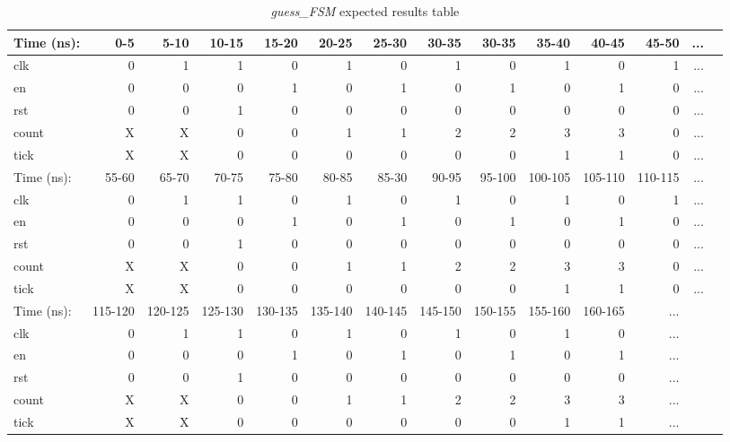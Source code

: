 \documentclass[11pt]{article}
\begin{document}
\begin{table}[ht]\centering
	\caption{\textit{guess\_FSM} expected results table}
	\label{ALU:tbl:alu_ERT}\medskip
	\begin{tabular}{l|rrrrrrrrrrrrr}
		Time (ns): & 0-5 & 5-10 & 10-15 & 15-20 & 20-25 & 25-30 & 30-35 & 30-35 & 35-40 & 40-45 & 45-50 &...\\
		\midrule
		clk & 0  & 1 & 1 & 0 & 1 & 0 & 1 & 0 & 1 & 0 & 1 & ... \\
		en & 0 & 0 & 0 & 1 & 0 & 1 & 0 & 1 & 0 & 1 & 0 & ...\\
		rst & 0 & 0 & 1& 0 & 0 & 0 & 0 & 0 & 0 & 0 & 0 & ... \\
		\midrule
		count & X & X & 0 & 0  & 1 & 1 & 2 & 2 & 3 & 3 & 0 & ... \\
		tick & X & X & 0 & 0 & 0 & 0 & 0 & 0 & 1 & 1 & 0& ... \\
		\midrule
		Time (ns): & 55-60 & 65-70 & 70-75 & 75-80 & 80-85 & 85-30 & 90-95 & 95-100 & 100-105 & 105-110 & 110-115 &...\\
		\midrule
		clk & 0  & 1 & 1 & 0 & 1 & 0 & 1 & 0 & 1 & 0 & 1 & ... \\
		en & 0 & 0 & 0 & 1 & 0 & 1 & 0 & 1 & 0 & 1 & 0 & ...\\
		rst & 0 & 0 & 1& 0 & 0 & 0 & 0 & 0 & 0 & 0 & 0 & ... \\
		\midrule
		count & X & X & 0 & 0  & 1 & 1 & 2 & 2 & 3 & 3 & 0 & ... \\
		tick & X & X & 0 & 0 & 0 & 0 & 0 & 0 & 1 & 1 & 0& ... \\
		\midrule
		Time (ns): & 115-120 & 120-125 & 125-130 & 130-135 & 135-140 & 140-145 & 145-150 & 150-155 & 155-160 & 160-165  &...\\
		\midrule
		clk & 0  & 1 & 1 & 0 & 1 & 0 & 1 & 0 & 1 & 0 & ... \\
		en & 0 & 0 & 0 & 1 & 0 & 1 & 0 & 1 & 0 & 1 & ...\\
		rst & 0 & 0 & 1& 0 & 0 & 0 & 0 & 0 & 0 & 0 & ... \\
		\midrule
		count & X & X & 0 & 0  & 1 & 1 & 2 & 2 & 3 & 3 & ... \\
		tick & X & X & 0 & 0 & 0 & 0 & 0 & 0 & 1 & 1 & ... \\
		\bottomrule
	\end{tabular}
\end{table}
\end{document}
